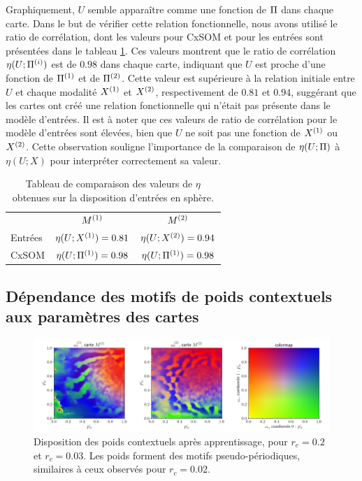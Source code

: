 \documentclass[../main]{subfiles}
\begin{document}
Graphiquement, $U$ semble apparaître comme une fonction de $\Pi$ dans chaque carte. Dans le but de vérifier cette relation fonctionnelle, nous avons utilisé le ratio de corrélation, dont les valeurs pour CxSOM et pour les entrées sont présentées dans le tableau \ref{tab:eta2D}. Ces valeurs montrent que le ratio de corrélation $\eta(U;\Pi^{({i})})$ est de $0.98$ dans chaque carte, indiquant que $U$ est proche d'une fonction de $\Pi^{({1})}$ et de $\Pi^{({2})}$. Cette valeur est supérieure à la relation initiale entre $U$ et chaque modalité $X^{({1})}$ et $X^{({2})}$, respectivement de $0.81$ et $0.94$, suggérant que les cartes ont créé une relation fonctionnelle qui n'était pas présente dans le modèle d'entrées.
Il est à noter que ces valeurs de ratio de corrélation pour le modèle d'entrées sont élevées, bien que $U$ ne soit pas une fonction de $X^{({1})}$ ou $X^{({2})}$. 
Cette observation souligne l'importance de la comparaison de $\eta(U;\Pi)$ à $\eta(U;X)$ pour interpréter correctement sa valeur.

\begin{table}
	\caption{Tableau de comparaison des valeurs de $\eta$ obtenues sur la disposition d'entrées en sphère. \label{tab:eta2D}}
	\centering\begin{tabular}{lcc}
						&$M^{({1})}$ 					& $M^{({2})}$ 						\\
		Entrées 		& $\eta(U;X^{({1})}) = 0.81$ & $\eta(U;X^{({2})}) = 0.94$  \\
		CxSOM  	 		& $\eta(U;\Pi^{({1})}) = 0.98$ & $\eta(U;\Pi^{({1})}) = 0.98$ 	\\
	\end{tabular}
\end{table}

\subsection{Dépendance des motifs de poids contextuels aux paramètres des cartes \label{par:params2D}}

\begin{figure}
	\includegraphics[width=\textwidth]{weights_contexte-0-048_rc003.png}
	\caption{Disposition des poids contextuels après apprentissage, pour $r_e = 0.2$ et $r_c = 0.03$. Les poids forment des motifs pseudo-périodiques, similaires à ceux observés pour $r_c = 0.02$. \label{fig:rc_003}}
\end{figure}
\end{document}
